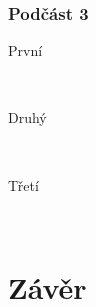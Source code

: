 \documentclass[12pt]{article} %
\begin{document}

\subsubsection{Podčást  3} %

\begin{description} %

\item[První] \hfill \\
\lipsum[9] %

\item[Druhý] \hfill \\
\lipsum[10] %

\item[Třetí] \hfill \\
\lipsum[11] %

\end{description} 









\section{Závěr} %
\end{document}
